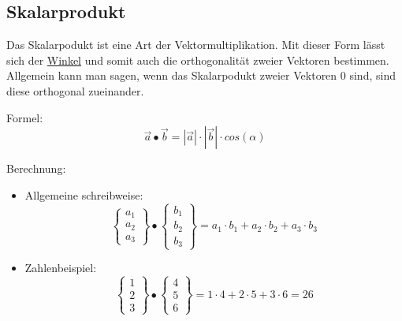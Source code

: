 \subsection{Skalarprodukt}
\label{sec:skalarprodukt}
Das Skalarpodukt ist eine Art der Vektormultiplikation.
Mit dieser Form lässt sich der 
\hyperref[sec:winkel_vektoren]{Winkel}
und somit auch die orthogonalität zweier Vektoren bestimmen. 
Allgemein kann man sagen, wenn das Skalarpodukt zweier Vektoren $0$ sind, sind diese orthogonal zueinander.

Formel: 
\[
\vec{a} \bullet \vec{b} = |\vec{a}| \cdot |\vec{b}| \cdot cos(\alpha)
\]

Berechnung:
\begin{itemize}

    \item Allgemeine schreibweise: 
    \[
        \begin{Bmatrix}
            a_1 \\ a_2 \\ a_3
        \end{Bmatrix}
        \bullet 
        \begin{Bmatrix}
            b_1 \\ b_2 \\ b_3
        \end{Bmatrix}
        =
        a_1 \cdot b_1 + a_2 \cdot b_2 + a_3 \cdot b_3
    \]
    \item Zahlenbeispiel: 
    \[
        \begin{Bmatrix}
            1 \\ 2 \\ 3
        \end{Bmatrix}
        \bullet
        \begin{Bmatrix}
        4 \\ 5 \\ 6
        \end{Bmatrix}
        = 
        1 \cdot 4 + 2 \cdot 5 + 3 \cdot 6 = 26
    \]
\end{itemize}

